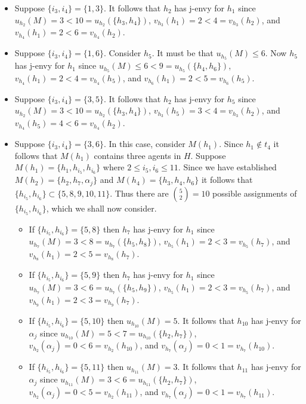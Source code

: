 \begin{itemize}
    \begin{itemize}
        \item Suppose $\{ {i_3}, {i_4} \} = \{ 1, 3 \}$. It follows that $h_2$ has j-envy for $h_1$ since $u_{h_2}(M) = 3 < 10 = u_{h_2}(\{ h_3, h_4 \})$, $v_{h_3}(h_1) = 2 < 4 = v_{h_3}(h_2)$, and $v_{h_4}(h_1) = 2 < 6 = v_{h_4}(h_2)$.
        \item Suppose $\{ {i_3}, {i_4} \} = \{ 1, 6 \}$. Consider $h_5$. It must be that $u_{h_5}(M) \leq 6$. Now $h_5$ has j-envy for $h_1$ since $u_{h_5}(M) \leq 6 < 9 = u_{h_5}(\{ h_4, h_6 \})$, $v_{h_4}(h_1) = 2 < 4 = v_{h_4}(h_5)$, and $v_{h_6}(h_1) = 2 < 5 = v_{h_6}(h_5)$.
        \item Suppose $\{ {i_3}, {i_4} \} = \{ 3, 5 \}$. It follows that $h_2$ has j-envy for $h_5$ since $u_{h_2}(M) = 3 < 10 = u_{h_2}(\{ h_3, h_4 \})$, $v_{h_3}(h_5) = 3 < 4 = v_{h_3}(h_2)$, and $v_{h_4}(h_5) = 4 < 6 = v_{h_4}(h_2)$.
        \item Suppose $\{ {i_3}, {i_4} \} = \{ 3, 6 \}$. In this case, consider $M(h_1)$. Since $h_1 \notin t_4$ it follows that $M(h_1)$ contains three agents in $H$. Suppose $M(h_1) = \{ h_1, h_{i_5}, h_{i_6} \}$ where $2 \leq {i_5}, {i_6} \leq 11$. Since we have established $M(h_2) = \{ h_2, h_7, \alpha_{j} \}$ and $M(h_4) = \{ h_3, h_4, h_6 \}$ it follows that $\{ h_{i_5}, h_{i_6} \} \subset \{ 5, 8, 9, 10, 11 \}$. Thus there are $\binom{5}{2}=10$ possible assignments of $\{ h_{i_5}, h_{i_6} \}$, which we shall now consider.
        \begin{itemize}
            \item If $\{ h_{i_5}, h_{i_6} \} = \{ 5, 8 \}$ then $h_7$ has j-envy for $h_1$ since $u_{h_7}(M) = 3 < 8 = u_{h_7}(\{ h_5, h_8 \})$, $v_{h_5}(h_1) = 2 < 3 = v_{h_5}(h_7)$, and $v_{h_8}(h_1) = 2 < 5 = v_{h_8}(h_7)$.
            \item If $\{ h_{i_5}, h_{i_6} \} = \{ 5, 9 \}$ then $h_7$ has j-envy for $h_1$ since $u_{h_7}(M) = 3 < 6 = u_{h_7}(\{ h_5, h_9 \})$, $v_{h_5}(h_1) = 2 < 3 = v_{h_5}(h_7)$, and $v_{h_9}(h_1) = 2 < 3 = v_{h_9}(h_7)$.
            \item If $\{ h_{i_5}, h_{i_6} \} = \{ 5, 10 \}$ then $u_{h_{10}}(M) = 5$. It follows that $h_{10}$ has j-envy for $\alpha_{j}$ since $u_{h_{10}}(M) = 5 < 7 = u_{h_{10}}(\{ h_2, h_7 \})$, $v_{h_2}(\alpha_{j}) = 0 < 6 = v_{h_2}(h_{10})$, and $v_{h_7}(\alpha_{j}) = 0 < 1 = v_{h_7}(h_{10})$.
            \item If $\{ h_{i_5}, h_{i_6} \} = \{ 5, 11 \}$ then $u_{h_{11}}(M) = 3$. It follows that $h_{11}$ has j-envy for $\alpha_{j}$ since $u_{h_{11}}(M) = 3 < 6 = u_{h_{11}}(\{ h_2, h_7 \})$, $v_{h_2}(\alpha_{j}) = 0 < 5 = v_{h_2}(h_{11})$, and $v_{h_7}(\alpha_{j}) = 0 < 1 = v_{h_7}(h_{11})$.

\end{itemize}
\end{itemize}
\end{itemize}
